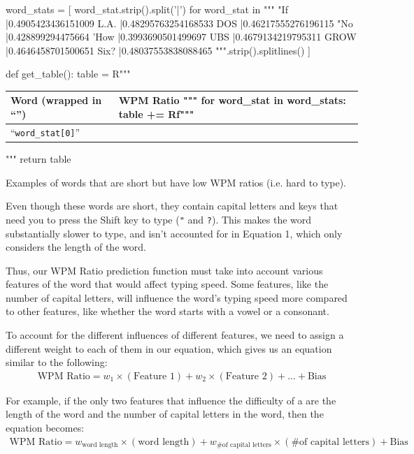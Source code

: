 \documentclass[12pt]{article}
\newcommand{\code}[1]{\texttt{#1}}
\begin{document}
\begin{pycode}
word_stats = [
	word_stat.strip().split('|') for word_stat in """
		"If |0.4905423436151009
		L.A. |0.48295763254168533
		DOS |0.46217555276196115
		"No |0.428899294475664
		'How |0.3993690501499697
		UBS |0.4679134219795311
		GROW |0.4646458701500651
		Six? |0.48037553838088465
	""".strip().splitlines()
]

def get_table():
	table = R"""
		\begin{center}
		\noindent
		\begin{tabularx}{
			0.5\linewidth
		}{|X|X|}
		\hline
		Word (wrapped in ``'') & WPM Ratio
	"""
	for word_stat in word_stats:
		table += Rf"""
			\\\hline
			``\code{{{word_stat[0]}}}'' & {"%
		"""
	table += R"""
		\\\hline
		\end{tabularx}
		\end{center}
	"""
	return table
\end{pycode}

\begin{table}[H]
	\caption{Examples of words that are short but have low WPM ratios (i.e. hard to type).}
\end{table}

Even though these words are short, they contain capital letters and keys that need you to press the Shift key to type (\code{"} and \code{?}). This makes the word substantially slower to type, and isn't accounted for in Equation 1, which only considers the length of the word.

Thus, our WPM Ratio prediction function must take into account various features of the word that would affect typing speed. Some features, like the number of capital letters, will influence the word's typing speed more compared to other features, like whether the word starts with a vowel or a consonant.

To account for the different influences of different features, we need to assign a different weight to each of them in our equation, which gives us an equation similar to the following:
\begin{align*}
	\text{WPM Ratio} = w_1 \times (\text{Feature 1}) + w_2 \times (\text{Feature 2}) + \dots + \text{Bias}
\end{align*}

For example, if the only two features that influence the difficulty of a are the length of the word and the number of capital letters in the word, then the equation becomes:
\begin{align*}
	\text{WPM Ratio} = w_{\text{word length}} \times (\text{word length}) + w_{\text{\# of capital letters}} \times (\text{\# of capital letters}) + \text{Bias}
\end{align*}
\end{document}
